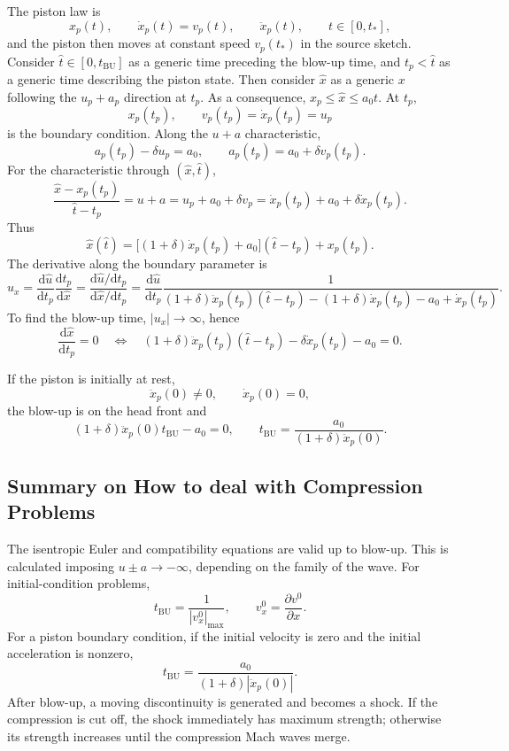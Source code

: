 \documentclass[11pt]{article}
\newcommand{\dd}{\mathrm{d}}
\begin{document}
The piston law is
\[
x_p(t),\qquad \dot x_p(t)=v_p(t),\qquad \ddot x_p(t),
\qquad t\in[0,t_*],
\]
and the piston then moves at constant speed \(v_p(t_*)\) in the source sketch.
Consider \(\widehat t\in[0,t_{\mathrm{BU}}]\) as a generic time preceding
the blow-up time, and \(t_p<\widehat t\) as a generic time describing the
piston state. Then consider \(\widehat x\) as a generic \(x\) following the
\(u_p+a_p\) direction at \(t_p\). As a consequence,
\(x_p\leq\widehat x\leq a_0t\).
At \(t_p\),
\[
x_p(t_p),\qquad v_p(t_p)=\dot x_p(t_p)=u_p
\]
is the boundary condition.  Along the \(u+a\) characteristic,
\[
a_p(t_p)-\delta u_p=a_0,
\qquad
a_p(t_p)=a_0+\delta v_p(t_p).
\]
For the characteristic through \((\widehat x,\widehat t)\),
\[
\frac{\widehat x-x_p(t_p)}{\widehat t-t_p}
=u+a
=u_p+a_0+\delta v_p
=\dot x_p(t_p)+a_0+\delta\dot x_p(t_p).
\]
Thus
\[
\widehat x(\widehat t)
=\bigl[(1+\delta)\dot x_p(t_p)+a_0\bigr]
(\widehat t-t_p)+x_p(t_p).
\]
The derivative along the boundary parameter is
\[
\widehat u_x
=\frac{\dd\widehat u}{\dd t_p}
\frac{\dd t_p}{\dd\widehat x}
=\frac{\dd\widehat u/\dd t_p}
{\dd\widehat x/\dd t_p}
=\frac{\dd\widehat u}{\dd t_p}
\frac{1}{(1+\delta)\ddot x_p(t_p)(\widehat t-t_p)
-(1+\delta)\dot x_p(t_p)-a_0+\dot x_p(t_p)}.
\]
To find the blow-up time, \(|u_x|\to\infty\), hence
\[
\frac{\dd\widehat x}{\dd t_p}=0
\quad\Longleftrightarrow\quad
(1+\delta)\ddot x_p(t_p)(\widehat t-t_p)
-\delta\dot x_p(t_p)-a_0=0.
\]

If the piston is initially at rest,
\[
\ddot x_p(0)\neq0,\qquad \dot x_p(0)=0,
\]
the blow-up is on the head front and
\[
(1+\delta)\ddot x_p(0)t_{\mathrm{BU}}-a_0=0,
\qquad
\boxed{t_{\mathrm{BU}}=
\frac{a_0}{(1+\delta)\ddot x_p(0)}}.
\]

\subsection*{Summary on How to deal with Compression Problems}
The isentropic Euler and compatibility equations are valid up to blow-up.
This is calculated imposing \(u\pm a\to-\infty\), depending on the family of
the wave. For initial-condition problems,
\[
t_{\mathrm{BU}}=\frac{1}{|v_x^0|_{\max}},
\qquad
v_x^0=\frac{\partial v^0}{\partial x}.
\]
For a piston boundary condition, if the initial velocity is zero and the
initial acceleration is nonzero,
\[
t_{\mathrm{BU}}=\frac{a_0}{(1+\delta)|\ddot x_p(0)|}.
\]
After blow-up, a moving discontinuity is generated and becomes a shock.  If
the compression is cut off, the shock immediately has maximum strength;
otherwise its strength increases until the compression Mach waves merge.
\end{document}
